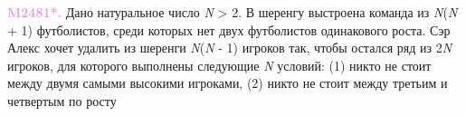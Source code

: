 \documentclass[a4paper,12pt]{article}
\begin{document}
\begin{multicols}{2}
\noindent
\textcolor{Plum}{\textbf{M2481*.}}
Дано натуральное число \textit{N} > 2. В
шеренгу выстроена команда из \textit{N}(\textit{N} + 1)
футболистов, среди которых нет двух
футболистов одинакового роста. Сэр Алекс
хочет удалить из шеренги \textit{N}(\textit{N} - 1) 
игроков так, чтобы остался ряд из 2\textit{N} игроков,
для которого выполнены следующие \textit{N}
условий: (1) никто не стоит между двумя
самыми высокими игроками, (2) никто не
стоит между третьим и четвертым по росту
\end{multicols}

\end{document}
